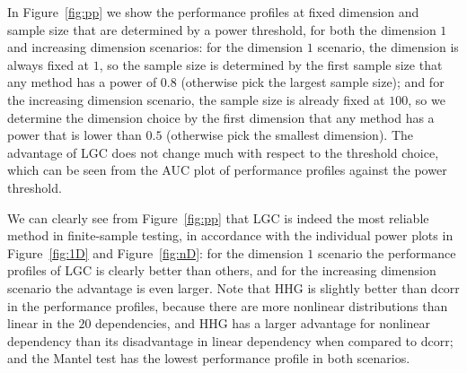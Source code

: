 \documentclass[11pt]{article}
\begin{document}
In Figure~\ref{fig:pp} we show the performance profiles at fixed dimension and sample size that are determined by a power threshold, for both the dimension $1$ and increasing dimension scenarios: for the dimension $1$ scenario, the dimension is always fixed at $1$, so the sample size is determined by the first sample size that any method has a power of $0.8$ (otherwise pick the largest sample size); and for the increasing dimension scenario, the sample size is already fixed at $100$, so we determine the dimension choice by the first dimension that any method has a power that is lower than $0.5$ (otherwise pick the smallest dimension). The advantage of LGC does not change much with respect to the threshold choice, which can be seen from the AUC plot of performance profiles against the power threshold.

We can clearly see from Figure~\ref{fig:pp} that LGC is indeed the most reliable method in finite-sample testing, in accordance with the individual power plots in Figure~\ref{fig:1D} and Figure~\ref{fig:nD}: for the dimension $1$ scenario the performance profiles of LGC is clearly better than others, and for the increasing dimension scenario the advantage is even larger. Note that HHG is slightly better than dcorr in the performance profiles, because there are more nonlinear distributions than linear in the $20$ dependencies, and HHG has a larger advantage for nonlinear dependency than its disadvantage in linear dependency when compared to dcorr; and the Mantel test has the lowest performance profile in both scenarios. 
\end{document}
